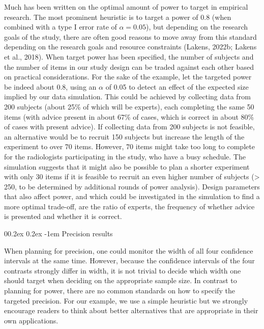 \documentclass[
  man,floatsintext]{apa6}
\makeatletter
\let\oldparagraph\paragraph
\renewcommand{\paragraph}[1]{\oldparagraph{#1}\mbox{}}
\renewcommand{\paragraph}{\@startsection{paragraph}{4}{\parindent}%
  {0\baselineskip \@plus 0.2ex \@minus 0.2ex}%
  {-1em}%
  {\normalfont\normalsize\bfseries\itshape\typesectitle}}
\makeatother
\begin{document}
Much has been written on the optimal amount of power to target in empirical research. The most prominent heuristic is to target a power of 0.8 (when combined with a type I error rate of \(\alpha = 0.05\)), but depending on the research goals of the study, there are often good reasons to move away from this standard depending on the research goals and resource constraints (Lakens, 2022b; Lakens et al., 2018). When target power has been specified, the number of subjects and the number of items in our study design can be traded against each other based on practical considerations. For the sake of the example, let the targeted power be indeed about 0.8, using an \(\alpha\) of 0.05 to detect an effect of the expected size implied by our data simulation. This could be achieved by collecting data from 200 subjects (about 25\% of which will be experts), each completing the same 50 items (with advice present in about 67\% of cases, which is correct in about 80\% of cases with present advice). If collecting data from 200 subjects is not feasible, an alternative would be to recruit 150 subjects but increase the length of the experiment to over 70 items. However, 70 items might take too long to complete for the radiologists participating in the study, who have a busy schedule. The simulation suggests that it might also be possible to plan a shorter experiment with only 30 items if it is feasible to recruit an even higher number of subjects (\textgreater{} 250, to be determined by additional rounds of power analysis). Design parameters that also affect power, and which could be investigated in the simulation to find a more optimal trade-off, are the ratio of experts, the frequency of whether advice is presented and whether it is correct.

\hypertarget{precision-results}{%
\paragraph{Precision results}\label{precision-results}}

When planning for precision, one could monitor the width of all four confidence intervals at the same time.
However, because the confidence intervals of the four contrasts strongly differ in width, it is not trivial to decide which width one should target when deciding on the appropriate sample size.
In contrast to planning for power, there are no common standards on how to specify the targeted precision.
For our example, we use a simple heuristic but we strongly encourage readers to think about better alternatives that are appropriate in their own applications.
\end{document}
